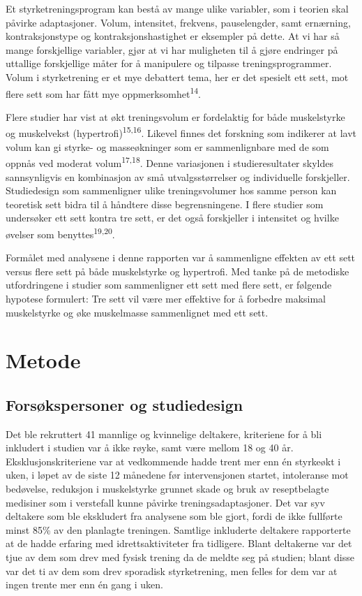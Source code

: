\documentclass[
  letterpaper,
  DIV=11,
  numbers=noendperiod]{scrreprt}
\begin{document}
Et styrketreningsprogram kan bestå av mange ulike variabler, som i
teorien skal påvirke adaptasjoner. Volum, intensitet, frekvens,
pauselengder, samt ernærning, kontraksjonstype og kontraksjonshastighet
er eksempler på dette. At vi har så mange forskjellige variabler, gjør
at vi har muligheten til å gjøre endringer på uttallige forskjellige
måter for å manipulere og tilpasse treningsprogrammer. Volum i
styrketrening er et mye debattert tema, her er det spesielt ett sett,
mot flere sett som har fått mye oppmerksomhet\textsuperscript{14}.

Flere studier har vist at økt treningsvolum er fordelaktig for både
muskelstyrke og muskelvekst (hypertrofi)\textsuperscript{15,16}. Likevel
finnes det forskning som indikerer at lavt volum kan gi styrke- og
masseøkninger som er sammenlignbare med de som oppnås ved moderat
volum\textsuperscript{17,18}. Denne variasjonen i studieresultater
skyldes sannsynligvis en kombinasjon av små utvalgsstørrelser og
individuelle forskjeller. Studiedesign som sammenligner ulike
treningsvolumer hos samme person kan teoretisk sett bidra til å håndtere
disse begrensningene. I flere studier som undersøker ett sett kontra tre
sett, er det også forskjeller i intensitet og hvilke øvelser som
benyttes\textsuperscript{19,20}.

Formålet med analysene i denne rapporten var å sammenligne effekten av
ett sett versus flere sett på både muskelstyrke og hypertrofi. Med tanke
på de metodiske utfordringene i studier som sammenligner ett sett med
flere sett, er følgende hypotese formulert: Tre sett vil være mer
effektive for å forbedre maksimal muskelstyrke og øke muskelmasse
sammenlignet med ett sett.

\section{Metode}\label{metode-5}

\subsection{Forsøkspersoner og
studiedesign}\label{forsuxf8kspersoner-og-studiedesign}

Det ble rekruttert 41 mannlige og kvinnelige deltakere, kriteriene for å
bli inkludert i studien var å ikke røyke, samt være mellom 18 og 40 år.
Eksklusjonskriteriene var at vedkommende hadde trent mer enn én
styrkeøkt i uken, i løpet av de siste 12 månedene før intervensjonen
startet, intoleranse mot bedøvelse, reduksjon i muskelstyrke grunnet
skade og bruk av reseptbelagte medisiner som i verstefall kunne påvirke
treningsadaptasjoner. Det var syv deltakere som ble ekskludert fra
analysene som ble gjort, fordi de ikke fullførte minst 85\% av den
planlagte treningen. Samtlige inkluderte deltakere rapporterte at de
hadde erfaring med idrettsaktiviteter fra tidligere. Blant deltakerne
var det tjue av dem som drev med fysisk trening da de meldte seg på
studien; blant disse var det ti av dem som drev sporadisk styrketrening,
men felles for dem var at ingen trente mer enn én gang i uken.
\end{document}
